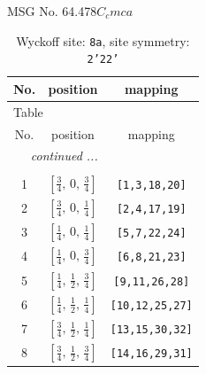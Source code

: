 \documentclass[fleqn,8pt]{jsarticle}
\begin{document}
\setcounter{MaxMatrixCols}{32}

\renewcommand{\tablename}{Table~}
\renewcommand{\figurename}{Figure~}
\begin{center}
\LARGE
MSG No. 64.478\quad$C_{c}mca$
\end{center}
\renewcommand{\arraystretch}{1.2}
\begin{longtable}{ccc}
\caption{Wyckoff site: {\tt 8a}, site symmetry: {\tt 2'22'}}
 \\
 \hline \hline
No. & position & mapping \\ \hline \endfirsthead

\multicolumn{2}{l}{\tablename\ \thetable{}} \\
 \hline \hline
No. & position & mapping \\ \hline \endhead

 \hline \hline
\multicolumn{2}{r}{\footnotesize\it continued ...} \\ \endfoot

 \hline \hline
\multicolumn{2}{r}{} \\ \endlastfoot

1 & $\left[ \frac{3}{4},\, 0,\, \frac{3}{4} \right]$ & {\tt [1,3,18,20]} \\ \hline
2 & $\left[ \frac{3}{4},\, 0,\, \frac{1}{4} \right]$ & {\tt [2,4,17,19]} \\ \hline
3 & $\left[ \frac{1}{4},\, 0,\, \frac{1}{4} \right]$ & {\tt [5,7,22,24]} \\ \hline
4 & $\left[ \frac{1}{4},\, 0,\, \frac{3}{4} \right]$ & {\tt [6,8,21,23]} \\ \hline
5 & $\left[ \frac{1}{4},\, \frac{1}{2},\, \frac{3}{4} \right]$ & {\tt [9,11,26,28]} \\ \hline
6 & $\left[ \frac{1}{4},\, \frac{1}{2},\, \frac{1}{4} \right]$ & {\tt [10,12,25,27]} \\ \hline
7 & $\left[ \frac{3}{4},\, \frac{1}{2},\, \frac{1}{4} \right]$ & {\tt [13,15,30,32]} \\ \hline
8 & $\left[ \frac{3}{4},\, \frac{1}{2},\, \frac{3}{4} \right]$ & {\tt [14,16,29,31]} \\
\end{longtable}
\renewcommand{\arraystretch}{1.2}
\end{document}
